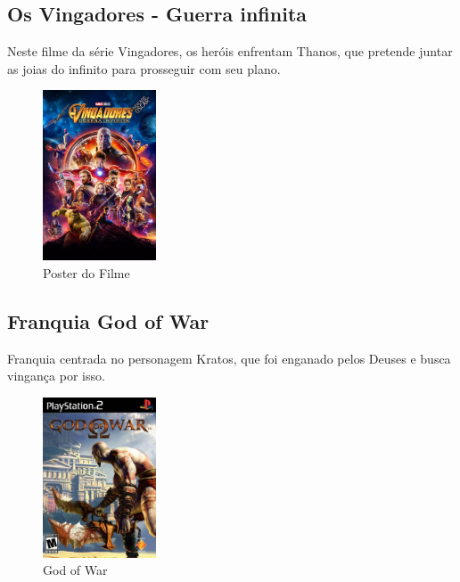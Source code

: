 \subsection{Os Vingadores - Guerra infinita}

Neste filme da série Vingadores, os heróis enfrentam Thanos, que pretende juntar
as joias do infinito para prosseguir com seu plano.

\begin{figure}[!htb] \caption{\label{vingadores}Poster do Filme} \begin{center}
\includegraphics[width=0.3\textwidth]{imagens/vingadores.jpeg} \end{center}
 \end{figure}

\subsection{Franquia God of War}

Franquia centrada no personagem Kratos, que foi enganado pelos Deuses e busca
vingança por isso.


\clearpage

\begin{figure}[!htb] \caption{\label{god_of_war}God of War} \begin{center}
\includegraphics[width=0.3\textwidth]{imagens/GodofWar.jpg} \end{center}
 \end{figure}


